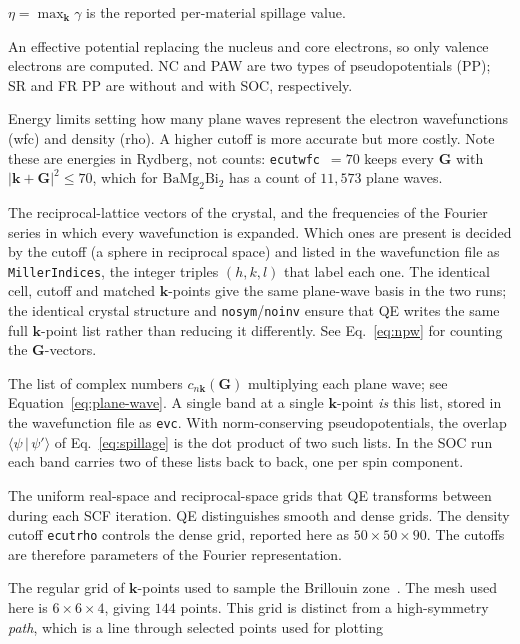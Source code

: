 \documentclass[11pt]{article}
\newcommand{\braket}[2]{\langle #1 \,\vert\, #2 \rangle}
\newcommand{\kk}{\mathbf{k}}
\newcommand{\GG}{\mathbf{G}}
\newcommand{\bmb}{\mathrm{BaMg_2Bi_2}}
\begin{document}
\begin{description}[leftmargin=0em,style=nextline,itemsep=2pt]
$\eta=\max_\kk\gamma$ is the reported per-material spillage value.
\item[Pseudopotential] An effective potential replacing the nucleus and core electrons, so only
valence electrons are computed. NC and PAW are two types of pseudopotentials (PP); SR and FR PP are
without and with SOC, respectively.
\item[Plane-wave cutoff (\texttt{ecutwfc}, \texttt{ecutrho})] Energy limits setting how many plane
waves represent the electron wavefunctions (wfc) and density (rho). A higher cutoff is more accurate
but more costly. Note these
are energies in Rydberg, not counts: \texttt{ecutwfc}~$=70$ keeps every $\GG$ with
$|\kk+\GG|^2 \le 70$, which for $\bmb$ has a count of $11{,}573$ plane waves.
\item[$\GG$ vectors] The reciprocal-lattice vectors of the crystal, and the frequencies of the
Fourier series in which every wavefunction is expanded. Which ones are present is decided by the
cutoff (a sphere in reciprocal space) and listed in the wavefunction file as
\texttt{MillerIndices}, the integer triples $(h,k,l)$ that label each one. The identical cell, cutoff
and matched $\kk$-points give the same plane-wave basis in the two runs; the identical crystal
structure and \texttt{nosym}/\texttt{noinv} ensure that
QE writes the same full $\kk$-point list rather than reducing it differently. See Eq.~\eqref{eq:npw}
for counting the $\GG$-vectors.
\item[Plane-wave coefficients] The list of complex numbers $c_{n\kk}(\GG)$ multiplying each plane
wave; see Equation~\eqref{eq:plane-wave}.
A single band at a single $\kk$-point \emph{is} this list, stored in the wavefunction file as
\texttt{evc}. With norm-conserving
pseudopotentials, the overlap $\braket{\psi}{\psi'}$ of Eq.~\eqref{eq:spillage} is the dot
product of two such lists. In the SOC run each band carries two of these lists back to back, one per
spin component.
\item[FFT grid] The uniform real-space and reciprocal-space grids that QE transforms between during
each SCF iteration. QE distinguishes smooth and dense grids. The density cutoff \texttt{ecutrho}
controls the dense grid,
reported here as $50\times50\times90$. The cutoffs are therefore parameters of the Fourier
representation.
\item[Monkhorst--Pack mesh] The regular grid of $\kk$-points used to sample the Brillouin
zone~\cite{monkhorst1976}. The mesh used here is $6\times6\times4$, giving $144$ points. This grid is
distinct from a high-symmetry \emph{path}, which is a line through selected points used for plotting

\end{description}
\end{document}
